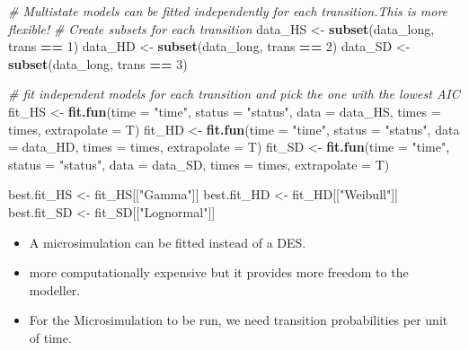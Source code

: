 \documentclass[
]{article}
\newenvironment{Shaded}{\begin{snugshade}}{\end{snugshade}}
\newcommand{\CommentTok}[1]{\textcolor[rgb]{0.56,0.35,0.01}{\textit{#1}}}
\newcommand{\DataTypeTok}[1]{\textcolor[rgb]{0.13,0.29,0.53}{#1}}
\newcommand{\DecValTok}[1]{\textcolor[rgb]{0.00,0.00,0.81}{#1}}
\newcommand{\KeywordTok}[1]{\textcolor[rgb]{0.13,0.29,0.53}{\textbf{#1}}}
\newcommand{\NormalTok}[1]{#1}
\newcommand{\OperatorTok}[1]{\textcolor[rgb]{0.81,0.36,0.00}{\textbf{#1}}}
\newcommand{\StringTok}[1]{\textcolor[rgb]{0.31,0.60,0.02}{#1}}
\providecommand{\tightlist}{%
  \setlength{\itemsep}{0pt}\setlength{\parskip}{0pt}}
\begin{document}
\begin{Shaded}
\begin{Highlighting}[]
\CommentTok{# Multistate models can be fitted independently for each transition.This is more flexible!}
\CommentTok{# Create subsets for each transition}
\NormalTok{data_HS <-}\StringTok{ }\KeywordTok{subset}\NormalTok{(data_long, trans }\OperatorTok{==}\StringTok{ }\DecValTok{1}\NormalTok{)}
\NormalTok{data_HD <-}\StringTok{ }\KeywordTok{subset}\NormalTok{(data_long, trans }\OperatorTok{==}\StringTok{ }\DecValTok{2}\NormalTok{)}
\NormalTok{data_SD <-}\StringTok{ }\KeywordTok{subset}\NormalTok{(data_long, trans }\OperatorTok{==}\StringTok{ }\DecValTok{3}\NormalTok{)}


\CommentTok{# fit independent models for each transition and pick the one with the lowest AIC}
\NormalTok{fit_HS <-}\StringTok{ }\KeywordTok{fit.fun}\NormalTok{(}\DataTypeTok{time =} \StringTok{"time"}\NormalTok{, }\DataTypeTok{status =} \StringTok{"status"}\NormalTok{, }\DataTypeTok{data =}\NormalTok{ data_HS, }\DataTypeTok{times =}\NormalTok{ times, }
                  \DataTypeTok{extrapolate =}\NormalTok{ T)}
\NormalTok{fit_HD <-}\StringTok{ }\KeywordTok{fit.fun}\NormalTok{(}\DataTypeTok{time =} \StringTok{"time"}\NormalTok{, }\DataTypeTok{status =} \StringTok{"status"}\NormalTok{, }\DataTypeTok{data =}\NormalTok{ data_HD, }\DataTypeTok{times =}\NormalTok{ times, }
                  \DataTypeTok{extrapolate =}\NormalTok{ T)}
\NormalTok{fit_SD <-}\StringTok{ }\KeywordTok{fit.fun}\NormalTok{(}\DataTypeTok{time =} \StringTok{"time"}\NormalTok{, }\DataTypeTok{status =} \StringTok{"status"}\NormalTok{, }\DataTypeTok{data =}\NormalTok{ data_SD, }\DataTypeTok{times =}\NormalTok{ times, }
                  \DataTypeTok{extrapolate =}\NormalTok{ T)}

\NormalTok{best.fit_HS <-}\StringTok{ }\NormalTok{fit_HS[[}\StringTok{"Gamma"}\NormalTok{]]}
\NormalTok{best.fit_HD <-}\StringTok{ }\NormalTok{fit_HD[[}\StringTok{"Weibull"}\NormalTok{]]}
\NormalTok{best.fit_SD <-}\StringTok{ }\NormalTok{fit_SD[[}\StringTok{"Lognormal"}\NormalTok{]]}
\end{Highlighting}
\end{Shaded}

\begin{itemize}
\tightlist
\item
  A microsimulation can be fitted instead of a DES.
\item
  more computationally expensive but it provides more freedom to the
  modeller.
\item
  For the Microsimulation to be run, we need transition probabilities
  per unit of time.
\end{itemize}
\end{document}
